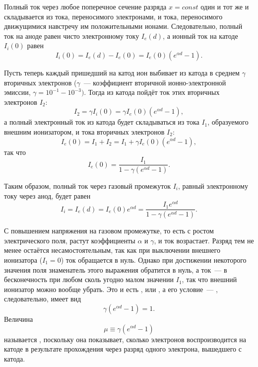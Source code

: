 Полный ток через любое поперечное сечение разряда $x=const$ один и тот же и складывается из тока, переносимого
электронами, и тока, переносимого движущимися навстречу им положительными ионами. Следовательно, полный ток на аноде
равен чисто электронному току $I_e(d)$, а ионный ток на катоде $I_i(0)$ равен
\begin{equation*}
	I_i(0)=I_e(d)-I_e(0)=I_e(0)(e^{\alpha d}-1).
\end{equation*}

Пусть теперь каждый пришедший на катод ион выбивает из катода в среднем $\gamma$ вторичных электронов ($\gamma$~--- коэффициент вторичной ионно-электронной эмиссии, $\gamma=10^{-1}-10^{-3})$. Тогда из катода пойдёт ток этих вторичных электронов $I_2$:
\begin{equation*}
	I_2=\gamma I_i(0)=\gamma I_e(0)(e^{\alpha d}-1),
\end{equation*}
а полный электронный ток из катода будет складываться из тока $I_1$, образуемого внешним ионизатором, и тока вторичных
электронов $I_2$:
\begin{equation*}
	I_e(0)=I_1+I_2=I_1+\gamma I_e(0)(e^{\alpha d}-1),
\end{equation*}
так что
\begin{equation*}
	I_e(0)=\frac{I_1}{1-\gamma(e^{\alpha d}-1)}.
\end{equation*}

Таким образом, полный ток через газовый промежуток $I_i$, равный электронному току через анод, будет равен
\begin{equation*}
	I_i=I_e(d)=I_e(0)e^{\alpha d}=\frac{I_1e^{\alpha d}}{1-\gamma(e^{\alpha d}-1)}.
\end{equation*}

С повышением напряжения на газовом промежутке, то есть с ростом электрического поля, растут коэффициенты $\alpha$ и
$\gamma$, и ток возрастает. Разряд тем не менее остаётся несамостоятельным, так как при выключении внешнего ионизатора
($I_1=0$) ток обращается в нуль. Однако при достижении некоторого значения поля знаменатель этого выражения обратится в
нуль, а ток~--- в бесконечность при любом сколь угодно малом значении $I_1$, так что внешний ионизатор можно вообще
убрать. Это и есть , или , а его
условие~--- , следовательно, имеет вид
\begin{equation*}
	\gamma(e^{\alpha d}-1)=1.
\end{equation*}
Величина
\begin{equation*}
	\mu\equiv\gamma(e^{\alpha d}-1)
\end{equation*}
называется , поскольку она показывает, сколько электронов воспроизводится на катоде в
результате прохождения через разряд одного электрона, вышедшего с катода.


